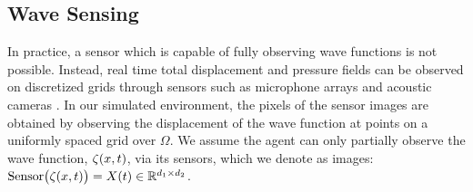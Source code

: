 

\subsection{Wave Sensing}





In practice, a sensor which is capable of fully observing wave functions is not possible. Instead, real time total displacement and pressure fields can be observed on discretized grids through sensors such as microphone arrays and  acoustic cameras \cite{bocanegra2022_acoustic_camera}. In our simulated environment, the pixels of the sensor images are obtained by observing the displacement of the wave function at points on a uniformly spaced grid over $\Omega$. We assume the agent can only partially observe the wave function, $\zeta(x, t)$, via its sensors, which we  denote as images: $\mbox{Sensor}\bigl(\zeta(x, t)\bigr) = X(t)\in \mathbb{R}^{d_1\times d_2}$.

